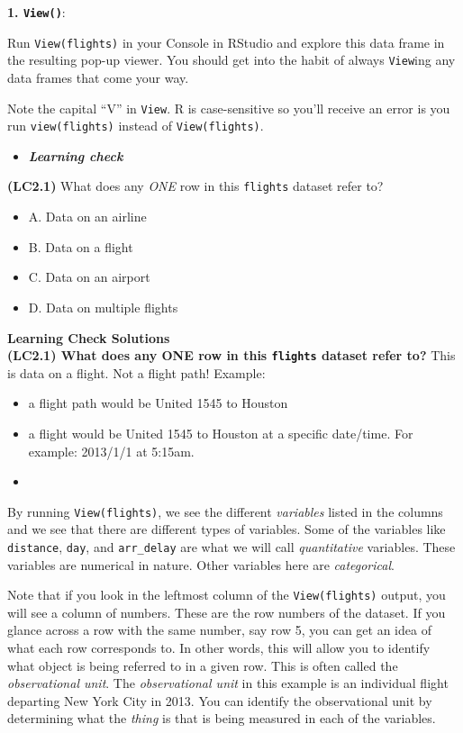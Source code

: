 \documentclass[12pt,]{krantz}
\providecommand{\tightlist}{%
  \setlength{\itemsep}{0pt}\setlength{\parskip}{0pt}}
\newenvironment{rmdblock}[1]
  {\begin{shaded*}
  \begin{itemize}
  \renewcommand{\labelitemi}{
    \raisebox{-.7\height}[0pt][0pt]{
    }
  }
  \item
  }
  {
  \end{itemize}
  \end{shaded*}
  }
\newenvironment{learncheck}
  {\begin{rmdblock}{warning}}
  {\end{rmdblock}}
\begin{document}
\textbf{1. \texttt{View()}}:

Run \texttt{View(flights)} in your Console in RStudio and explore this
data frame in the resulting pop-up viewer. You should get into the habit
of always \texttt{View}ing any data frames that come your way.

Note the capital ``V'' in \texttt{View}. R is case-sensitive so you'll
receive an error is you run \texttt{view(flights)} instead of
\texttt{View(flights)}.

\begin{learncheck}
\textbf{\emph{Learning check}}
\end{learncheck}

\textbf{(LC2.1)} What does any \emph{ONE} row in this \texttt{flights}
dataset refer to?

\begin{itemize}
\tightlist
\item
  A. Data on an airline
\item
  B. Data on a flight
\item
  C. Data on an airport
\item
  D. Data on multiple flights
\end{itemize}

\textbf{Learning Check Solutions}\\
\textbf{(LC2.1) What does any ONE row in this \texttt{flights} dataset
refer to?} This is data on a flight. Not a flight path! Example:

\begin{itemize}
\tightlist
\item
  a flight path would be United 1545 to Houston
\item
  a flight would be United 1545 to Houston at a specific date/time. For
  example: 2013/1/1 at 5:15am.
\end{itemize}

\begin{learncheck}

\end{learncheck}

By running \texttt{View(flights)}, we see the different \emph{variables}
listed in the columns and we see that there are different types of
variables. Some of the variables like \texttt{distance}, \texttt{day},
and \texttt{arr\_delay} are what we will call \emph{quantitative}
variables. These variables are numerical in nature. Other variables here
are \emph{categorical}.

Note that if you look in the leftmost column of the
\texttt{View(flights)} output, you will see a column of numbers. These
are the row numbers of the dataset. If you glance across a row with the
same number, say row 5, you can get an idea of what each row corresponds
to. In other words, this will allow you to identify what object is being
referred to in a given row. This is often called the \emph{observational
unit}. The \emph{observational unit} in this example is an individual
flight departing New York City in 2013. You can identify the
observational unit by determining what the \emph{thing} is that is being
measured in each of the variables.
\end{document}
